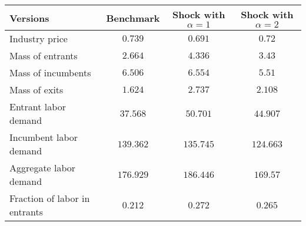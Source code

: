 \begin{tabular}{lccc}
\toprule
Versions & Benchmark & Shock with $\alpha = 1$ & Shock with $\alpha = 2$\\
\toprule
Industry price & $0.739$ & $0.691$ & $0.72$\\
Mass of entrants & $2.664$ & $4.336$ & $3.43$\\
Mass of incumbents & $6.506$ & $6.554$ & $5.51$\\
Mass of exits & $1.624$ & $2.737$ & $2.108$\\
Entrant labor demand & $37.568$ & $50.701$ & $44.907$\\
Incumbent labor demand & $139.362$ & $135.745$ & $124.663$\\
Aggregate labor demand & $176.929$ & $186.446$ & $169.57$\\
Fraction of labor in entrants & $0.212$ & $0.272$ & $0.265$\\
\toprule
\end{tabular}